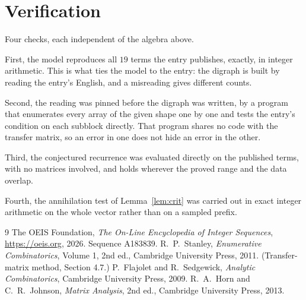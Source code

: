 \documentclass[11pt,a4paper]{article}
\theoremstyle{plain}
\theoremstyle{definition}
\begin{document}
\section{Verification}

Four checks, each independent of the algebra above.

First, the model reproduces all $19$ terms the entry publishes, exactly, in integer
arithmetic. This is what ties the model to the entry: the digraph is built by reading the
entry's English, and a misreading gives different counts.

Second, the reading was pinned before the digraph was written, by a program that enumerates
every array of the given shape one by one and tests the entry's condition on each subblock
directly. That program shares no code with the transfer matrix, so an error in one does not
hide an error in the other.

Third, the conjectured recurrence was evaluated directly on the published terms, with no
matrices involved, and holds wherever the proved range and the data overlap.

Fourth, the annihilation test of Lemma~\ref{lem:crit} was carried out in exact integer
arithmetic on the whole vector rather than on a sampled prefix.

\begin{thebibliography}{9}
 The OEIS Foundation, \emph{The On-Line Encyclopedia of Integer
Sequences}, \url{https://oeis.org}, 2026. Sequence A183839.
 R.~P.~Stanley, \emph{Enumerative Combinatorics}, Volume 1, 2nd ed.,
Cambridge University Press, 2011. (Transfer-matrix method, Section 4.7.)
 P.~Flajolet and R.~Sedgewick, \emph{Analytic Combinatorics}, Cambridge
University Press, 2009.
 R.~A.~Horn and C.~R.~Johnson, \emph{Matrix Analysis}, 2nd ed., Cambridge
University Press, 2013.
\end{thebibliography}
\end{document}
